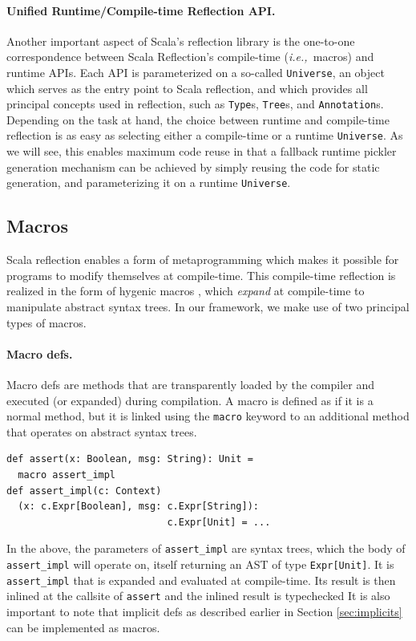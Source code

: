 \documentclass[preprint,10pt]{sigplanconf}
\theoremstyle{definition}
\theoremstyle{definition}
\newcommand{\ie}{{\em i.e.,~}}
\begin{document}
\paragraph{Unified Runtime/Compile-time Reflection API.} Another important
aspect of Scala's reflection library is the one-to-one correspondence between
Scala Reflection's compile-time (\ie macros) and runtime APIs. Each API is
parameterized on a so-called \verb|Universe|, an object which serves as the
entry point to Scala reflection, and which provides all principal concepts
used in reflection, such as \verb|Type|s, \verb|Tree|s, and
\verb|Annotation|s. Depending on the task at hand, the choice between runtime
and compile-time reflection is as easy as selecting either a compile-time or a
runtime \verb|Universe|. As we will see, this enables maximum code
reuse in that a fallback runtime pickler generation mechanism can be achieved
by simply reusing the code for static generation, and parameterizing it on a
runtime \verb|Universe|.


\subsection{Macros}
\label{sec:macros}

Scala reflection enables a form of metaprogramming which makes it possible for
programs to modify themselves at compile-time. This compile-time reflection is
realized in the form of hygenic macros \cite{Burmako2012}, which {\em expand}
at compile-time to manipulate abstract syntax trees. In our framework, we make
use of two principal types of macros.

\paragraph{Macro defs.} Macro defs are methods that are transparently loaded
by the compiler and executed (or expanded) during compilation. A macro is
defined as if it is a normal method, but it is linked using the \verb|macro|
keyword to an additional method that operates on abstract syntax trees.

\begin{lstlisting}
def assert(x: Boolean, msg: String): Unit =
  macro assert_impl
def assert_impl(c: Context)
  (x: c.Expr[Boolean], msg: c.Expr[String]):
                            c.Expr[Unit] = ...
\end{lstlisting}

In the above, the parameters of \verb|assert_impl| are syntax
trees, which the body of \verb|assert_impl| will operate on, itself returning
an AST of type \verb|Expr[Unit]|. It is \verb|assert_impl| that is
expanded and evaluated at compile-time. Its result is then inlined at the
callsite of \verb|assert| and the inlined result is typechecked
It is also important to note that implicit defs as described earlier
in Section \ref{sec:implicits} can be implemented as macros.
\end{document}
